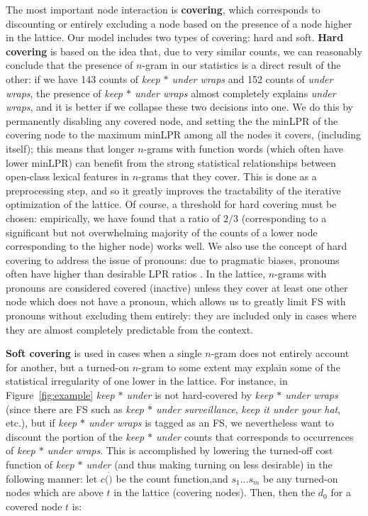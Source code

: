 \documentclass[11pt,letterpaper]{article}
\makeatletter
\def \etc {etc.\@ }
\newcommand{\dotts}{...}
\newcommand{\gap}{$*$\xspace}
\newcommand{\ex}[1]{\textit{#1}\xspace}
\newcommand{\termdef}[1]{\textbf{#1}\xspace}
\newcommand{\figref}[2][]{Figure#1~\ref{#2}\xspace}
\makeatother
\begin{document}
The most important node interaction is \termdef{covering}, which corresponds to discounting or entirely excluding a node based on the presence of a node higher in the lattice. Our model includes two types of covering: hard and soft. \termdef{Hard covering} is based on the idea that, due to very similar counts, we can reasonably conclude that the presence of $n$-gram in our statistics is a direct result of the other: if we have 143 counts of \ex{keep \gap under wraps} and 152 counts of \ex{under wraps}, the presence of \ex{keep \gap under wraps} almost completely explains \ex{under wraps}, and it is better if we collapse these two decisions into one. We do this by permanently disabling any covered node, and setting the the minLPR of the covering node to the maximum minLPR among all the nodes it covers, (including itself); this means that longer $n$-grams with function words (which often have lower minLPR) can benefit from the strong statistical relationships between open-class lexical features in $n$-grams that they cover. This is done as a preprocessing step, and so it greatly improves the tractability of the iterative optimization of the lattice. Of course, a threshold for hard covering must be chosen: empirically, we have found that a ratio of $2/3$ (corresponding to a significant but not overwhelming majority of the counts of a lower node corresponding to the higher node) works well.  We also use the concept of hard covering to address the issue of pronouns: due to pragmatic biases, pronouns often have higher than desirable LPR ratios \cite{Brooke15b}. In the lattice, $n$-grams with pronouns are considered covered (inactive) unless they cover at least one other node which does not have a pronoun, which allows us to greatly limit FS with pronouns without excluding them entirely: they are included only in cases where they are almost completely predictable from the context. 


\termdef{Soft covering} is used in cases when a single $n$-gram does not entirely account for another, but a turned-on $n$-gram to some extent may explain some of the statistical irregularity of one lower in the lattice. For instance, in \figref{fig:example} \ex{keep \gap under} is not hard-covered by \ex{keep \gap under wraps} (since there are FS such as \ex{keep \gap under surveillance}, \ex{keep it under your hat}, \etc), but if \ex{keep \gap under wraps} is tagged as an FS, we nevertheless want to discount the portion of the \ex{keep \gap under} counts that corresponds to occurrences of \ex{keep \gap under wraps}. This is accomplished by lowering the turned-off cost function of \ex{keep \gap under} (and thus making turning on less desirable) in the following manner: let $c(\dot)$ be the count function,and $s_1\dotts s_m$ be any turned-on nodes which are above $t$ in the lattice (covering nodes). Then, then the $d_0$ for a covered node $t$ is:
\end{document}
